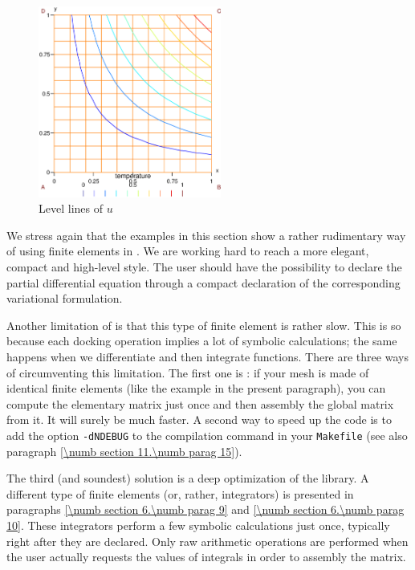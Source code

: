 \begin{figure} \centering
  \includegraphics[width=60mm]{square-Dirichlet}
  \caption{Level lines of $u$}
  \label{\numb section 6.\numb fig 1}
\end{figure}

We stress again that the examples in this section show a rather rudimentary way of
using finite elements in \maniFEM.
We are working hard to reach a more elegant, compact and high-level style.
The user should have the possibility to declare the partial differential equation
through a compact declaration of the corresponding variational formulation.

Another limitation of {\maniFEM} is that this type of finite element is rather slow.
This is so because each docking operation implies a lot of symbolic calculations;
the same happens when we differentiate and then integrate functions.
There are three ways of circumventing this limitation.
The first one is : if your mesh is made of identical finite elements
(like the example in the present paragraph), you can compute the elementary matrix
just once and then assembly the global matrix from it.
It will surely be much faster.
A second way to speed up the code is to add the option {\small\tt -dNDEBUG} to the compilation
command in your {\small\tt Makefile} (see also paragraph \ref{\numb section 11.\numb parag 15}).

The third (and soundest) solution is a deep optimization of the {\maniFEM} library.
A different type of finite elements (or, rather, integrators) is presented in paragraphs
\ref{\numb section 6.\numb parag 9} and \ref{\numb section 6.\numb parag 10}.
These integrators perform a few symbolic calculations just once,
typically right after they are declared.
Only raw arithmetic operations are performed when the user actually requests the values
of integrals in order to assembly the matrix.


